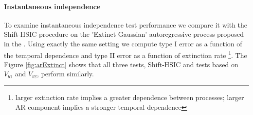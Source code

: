 \vspace{-0.2cm}
\paragraph{Instantaneous independence}
To examine instantaneous independence test performance we compare it with the Shift-HSIC procedure \cite{chwialkowski2014kernel} on the 'Extinct Gaussian' autoregressive process proposed in the \cite[Section 4.1]{chwialkowski2014kernel}. Using exactly the same setting we compute type I error as a function of the temporal dependence and type II error as a function of extinction rate \footnote{larger extinction rate implies a greater dependence between processes; larger AR component implies a stronger temporal dependence}. The Figure \ref{fig:arExtinct} shows that all three tests, Shift-HSIC and tests based on $V_{b1}$ and $V_{b2}$, perform similarly.   
\vspace{-0.2cm}
